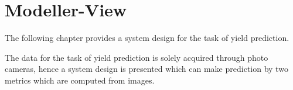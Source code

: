 \section{Modeller-View}

The following chapter provides a system design for the task of yield prediction.

The data for the task of yield prediction is solely acquired through photo cameras, hence a system design is
presented which can make prediction by two metrics which are computed from images.